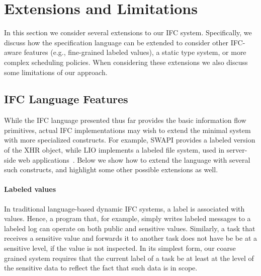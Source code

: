 \section{Extensions and Limitations}
\label{sec:extensions}

In this section we consider several extensions to our IFC system.
%
Specifically, we discuss how the specification language can be
extended to consider other IFC-aware features (e.g., fine-grained
labeled values), a static type system, or more complex scheduling
policies.
%
When considering these extensions we also discuss some limitations
of our approach.

\subsection{IFC Language Features}
\label{sec:extensions:labeled}

While the IFC language presented thus far provides the basic
information flow primitives, actual IFC implementations
may wish to extend the minimal system with more specialized
constructs.
For example, SWAPI provides a labeled version of the XHR object, while
LIO implements a labeled file system, used in server-side web
applications~\cite{hails}.
Below we show how to extend the language with several such constructs,
and highlight some other possible extensions as well.
%

\paragraph{Labeled values}
In traditional language-based dynamic IFC systems, a label is
associated with values.
%
Hence, a program that, for example, simply writes labeled messages to
a labeled log can operate on both public and sensitive values.
Similarly, a task that receives a sensitive value and forwards it
to another task does not have be be at a sensitive level, if the
value is not inspected.
%
In its simplest form, our coarse grained system requires that the
current label of a task be at least at the level of the sensitive data
to reflect the fact that such data is in scope.

